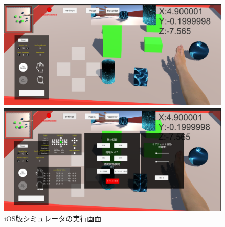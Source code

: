 \documentclass{ltjsreport}
\begin{document}
		\begin{figure}[H]
		\centering
		\begin{minipage}{0.75\columnwidth}
		\centering
		\includegraphics[width = \columnwidth]{../figs/iOSnomal.png}
		\end{minipage}
		\hspace{0.04\columnwidth}
		\begin{minipage}{0.75\columnwidth}
		\centering
		\includegraphics[width = \columnwidth]{../figs/iOSmenu.png}
		\end{minipage}
		\caption{iOS版シミュレータの実行画面}
		\label{fig:iOSsimulate}
		\end{figure}
	
\end{document}
